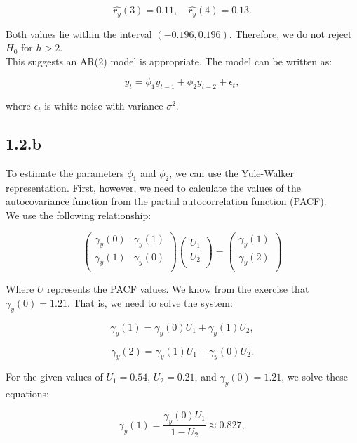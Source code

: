 \documentclass{article}
\begin{document}
\[
\hat{r_y}(3) = 0.11, \quad \hat{r_y}(4) = 0.13.
\]

Both values lie within the interval \( (-0.196, 0.196) \). Therefore, we do not reject \( H_0 \) for \( h > 2 \). \\

This suggests an AR(2) model is appropriate. The model can be written as:

\[
y_t = \phi_1 y_{t-1} + \phi_2 y_{t-2} + \epsilon_t,
\]

where \( \epsilon_t \) is white noise with variance \( \sigma^2 \).

\subsection*{1.2.b}

To estimate the parameters \(\phi_{1}\) and \(\phi_{2}\), we can use the Yule-Walker representation.
First, however, we need to calculate the values of the autocovariance function from the partial autocorrelation function (PACF). 
\\
We use the following relationship:

\[
\begin{pmatrix}
  \gamma_{y}(0) & \gamma_{y}(1)\\ 
  \gamma_{y}(1) & \gamma_{y}(0) \\
  \end{pmatrix} \begin{pmatrix}
    U_{1}\\
    U_{2}\\
  \end{pmatrix}= \begin{pmatrix}
    \gamma_{y}(1) \\
    \gamma_{y}(2)\\ 
  \end{pmatrix}
\]

Where \( U \) represents the PACF values. We know from the exercise that \(\gamma_{y}(0) = 1.21\). That is, we need to solve the system:

\[
\gamma_{y}(1) = \gamma_{y}(0) U_{1} + \gamma_{y}(1) U_{2},
\]

\[
\gamma_{y}(2) = \gamma_{y}(1) U_{1} + \gamma_{y}(0) U_{2}.
\]

For the given values of \( U_{1} = 0.54 \), \( U_{2} = 0.21 \), and \( \gamma_{y}(0) = 1.21 \), we solve these equations:

\[
\gamma_{y}(1) = \frac{\gamma_{y}(0) U_{1}}{1 - U_{2}} \approx 0.827,
\]
\end{document}
